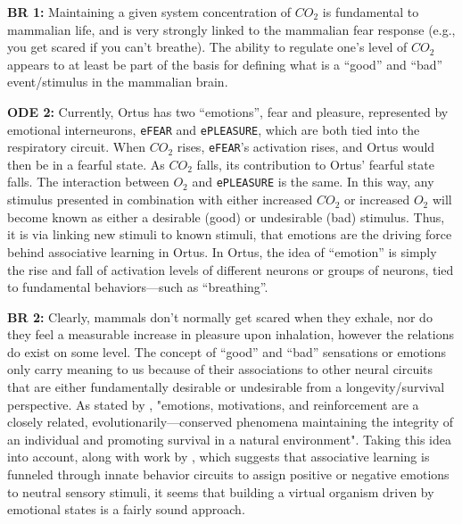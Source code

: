 \documentclass[letterpaper]{article}
\begin{document}
\textbf{BR 1:} Maintaining a given system concentration of $CO_2$ is fundamental to mammalian life, and is very strongly linked to the mammalian fear response (e.g., you get scared if you can't breathe). The ability to regulate one's level of $CO_2$ appears to at least be part of the basis for defining what is a ``good'' and ``bad'' event/stimulus in the mammalian brain.

\textbf{ODE 2:} Currently, Ortus has two ``emotions'', fear and pleasure, represented by emotional interneurons, \texttt{eFEAR} and \texttt{ePLEASURE}, which are both tied into the respiratory circuit. When $CO_2$ rises, \texttt{eFEAR}'s activation rises, and Ortus would then be in a fearful state. As $CO_2$ falls, its contribution to Ortus' fearful state falls. The interaction between $O_2$ and \texttt{ePLEASURE} is the same. In this way, any stimulus presented in combination with either increased $CO_2$ or increased $O_2$ will become known as either a desirable (good) or undesirable (bad) stimulus. Thus, it is via linking new stimuli to known stimuli, that emotions are the driving force behind associative learning in Ortus. In Ortus, the idea of ``emotion'' is simply the rise and fall of activation levels of different neurons or groups of neurons, tied to fundamental behaviors---such as ``breathing''.

\textbf{BR 2:} Clearly, mammals don't normally get scared when they exhale, nor do they feel a measurable increase in pleasure upon inhalation, however the relations do exist on some level. The concept of ``good'' and ``bad'' sensations or emotions only carry meaning to us because of their associations to other neural circuits that are either fundamentally desirable or undesirable from a longevity/survival perspective.
As stated by \citet{Verma2015}, "emotions, motivations, and reinforcement are a closely related, evolutionarily---conserved phenomena maintaining the integrity of an individual and promoting survival in a natural environment". Taking this idea into account, along with work by \citet{Gore2015}, which suggests that associative learning is funneled through innate behavior circuits to assign positive or negative emotions to neutral sensory stimuli, it seems that building a virtual organism driven by emotional states is a fairly sound approach. 
\end{document}
